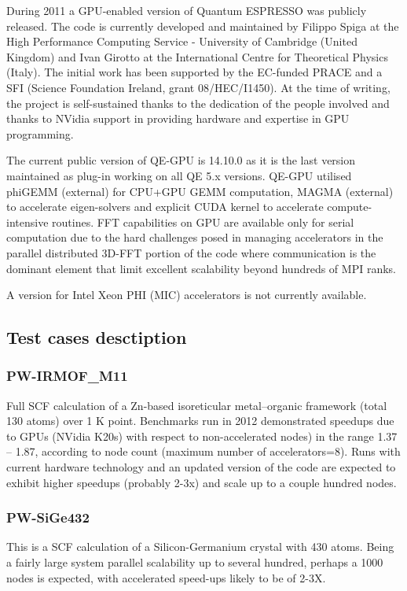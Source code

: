 During 2011 a GPU-enabled version of Quantum ESPRESSO was publicly released. The code is currently developed and maintained by Filippo Spiga at the High Performance Computing Service - University of Cambridge (United Kingdom) and Ivan Girotto at the International Centre for Theoretical Physics (Italy). The initial work has been supported by the EC-funded PRACE and a SFI (Science Foundation Ireland, grant 08/HEC/I1450). At the time of writing, the project is self-sustained thanks to the dedication of the people involved and thanks to NVidia support in providing hardware and expertise in GPU programming.

The current public version of QE-GPU is 14.10.0 as it is the last version maintained as plug-in working on all QE 5.x versions. QE-GPU utilised phiGEMM (external) for CPU+GPU GEMM computation, MAGMA (external) to accelerate eigen-solvers and explicit CUDA kernel to accelerate compute-intensive routines. FFT capabilities on GPU are available only for serial computation due to the hard challenges posed in managing accelerators in the parallel distributed 3D-FFT portion of the code where communication is the dominant element that limit excellent scalability beyond hundreds of MPI ranks.

A version for Intel Xeon PHI (MIC) accelerators is not currently available.

\subsection{Test cases desctiption}


\subsubsection{PW-IRMOF\_M11}
Full SCF calculation of a Zn-based isoreticular metal–organic framework (total 130 atoms) over 1 K point.  Benchmarks run in 2012 demonstrated speedups due to GPUs (NVidia K20s) with respect to non-accelerated nodes) in the range 1.37 – 1.87, according to node count (maximum number of accelerators=8). Runs with current hardware technology and an updated version of the code are expected to exhibit higher speedups (probably 2-3x) and scale up to a couple hundred nodes.


\subsubsection{PW-SiGe432}
This is a SCF calculation of a Silicon-Germanium crystal with 430 atoms. Being a fairly large system parallel scalability up to several hundred, perhaps a 1000 nodes is expected, with accelerated speed-ups likely to be of 2-3X.

